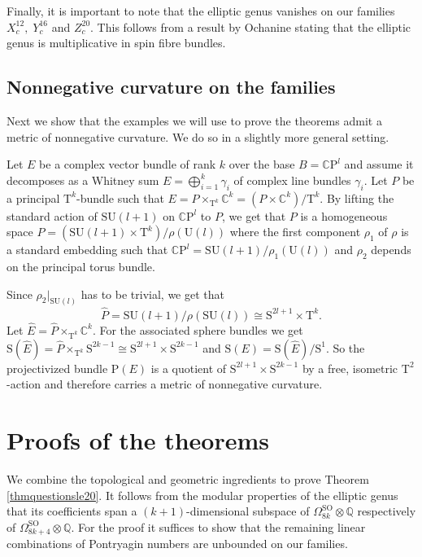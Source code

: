 \documentclass[10pt,a4paper]{amsart}
\theoremstyle{thm}
\theoremstyle{text}
\begin{document}
Finally, it is important to note that the elliptic genus vanishes on our families $X^{12}_c, \; Y^{16}_c$ and $Z^{20}_c$. This follows from a result by Ochanine \cite{Och88}  stating that the elliptic genus is multiplicative in spin fibre bundles.

\subsection{Nonnegative curvature on the families}
Next we show that the examples we will use to prove the theorems admit a metric of nonnegative curvature. We do so in a slightly more general setting.

Let $E$ be a complex vector bundle of rank $k$ over the base $B={\mathbb{C}\mathrm{P}}^l$ and assume it decomposes as a Whitney sum $E=\bigoplus_{i=1}^k \gamma_i$ of complex line bundles $\gamma_i$. Let $P$ be a principal ${\mathrm{T}}^k$-bundle such that $E=P\times_{{\mathrm{T}}^k} {\mathbb{C}}^k=(P\times {\mathbb{C}}^k)/{\mathrm{T}}^k$. By lifting the standard action of ${\mathrm{SU}}(l+1)$ on ${\mathbb{C}\mathrm{P}}^l$ to $P$, we get that $P$ is a homogeneous space $P=({\mathrm{SU}}(l+1)\times {\mathrm{T}}^k)/\rho({\mathrm{U}}(l))$ where the first component $\rho_1$ of $\rho$ is a standard embedding such that ${\mathbb{C}\mathrm{P}}^l={\mathrm{SU}}(l+1)/\rho_1({\mathrm{U}}(l))$ and $\rho_2$ depends on the principal torus bundle. 

Since $\rho_2|_{{\mathrm{SU}}(l)}$ has to be trivial, we get that \[\hat{P}={\mathrm{SU}}(l+1)/\rho({\mathrm{SU}}(l))\cong{\mathrm{S}}^{2l+1}\times {\mathrm{T}}^k.\] 
Let $\hat{E}=\hat{P}\times_{{\mathrm{T}}^k}{\mathbb{C}}^k$.  For the associated sphere bundles we get $ {\mathrm{S}}(\hat{E})=\hat{P}\times_{{\mathrm{T}}^k} {\mathrm{S}}^{2k-1} \cong {\mathrm{S}}^{2l+1}\times {\mathrm{S}}^{2k-1}$ and ${\mathrm{S}}(E)={\mathrm{S}}(\hat{E})/{\mathrm{S}}^1$. So the projectivized bundle $\mathrm{P}(E)$ is a quotient of ${\mathrm{S}}^{2l+1}\times {\mathrm{S}}^{2k-1}$ by a free, isometric ${\mathrm{T}}^2$-action and therefore carries a metric of nonnegative curvature. 

\section{Proofs of the theorems}

We combine the topological and geometric ingredients to prove Theorem \ref{thmquestionsle20}. It follows from the modular properties of the elliptic genus that its coefficients span a $(k+1)$-dimensional subspace of $\Omega_{8k}^{\textrm{SO}} \otimes {\mathbb{Q}}$ respectively of $\Omega_{8k+4}^{\textrm{SO}} \otimes {\mathbb{Q}}$. For the proof it suffices to show that the remaining linear combinations of Pontryagin numbers are unbounded on our families.
\end{document}

